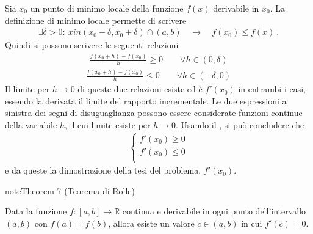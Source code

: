 \documentclass[letterpaper,10pt,italian]{jupyterBook}
\begin{document}
\sphinxAtStartPar
Sia \(x_0\) un punto di minimo locale della funzione \(f(x)\) derivabile in \(x_0\). La definizione di minimo locale permette di scrivere
\begin{equation*}
\begin{split}\exists \delta > 0: \ x in (x_0 - \delta, x_0 + \delta) \cap (a,b) \quad \rightarrow \quad f(x_0) \le f(x) \ .\end{split}
\end{equation*}
\sphinxAtStartPar
Quindi si possono scrivere le seguenti relazioni
\begin{equation*}
\begin{split}\frac{f(x_0 + h) - f(x_0)}{h} \ge 0 \qquad \forall h \in (0, \delta)\end{split}
\end{equation*}\begin{equation*}
\begin{split}\frac{f(x_0 + h) - f(x_0)}{h} \le 0 \qquad \forall h \in (-\delta,0)\end{split}
\end{equation*}
\sphinxAtStartPar
Il limite per \(h \rightarrow 0\) di queste due relazioni esiste ed è \(f'(x_0)\) in entrambi i casi, essendo la derivata il limite del rapporto incrementale. Le due espressioni a sinistra dei segni di disuguaglianza possono essere considerate funzioni continue della variabile \(h\), il cui limite esiste per \(h \rightarrow 0\). Usando il {\hyperref[\detokenize{ch/infinitesimal_calculus/analysis:infinitesimal-calculus-continuous-fun-thms-sign}]{}}, si può concludere che
\begin{equation*}
\begin{split}\begin{cases}
  f'(x_0) \ge 0 \\
  f'(x_0) \le 0 \\
\end{cases}\end{split}
\end{equation*}
\sphinxAtStartPar
e da queste la dimostrazione della tesi del problema, \(f'(x_0)\).


\label{ch/infinitesimal_calculus/derivatives:thm:infinitesimal-calculus:derivatives:thm:rolle}
\begin{sphinxadmonition}{note}{Theorem 7 (Teorema di Rolle)}



\sphinxAtStartPar
Data la funzione \(f: [a,b] \rightarrow \mathbb{R}\) continua e derivabile in ogni punto dell’intervallo \((a,b)\) con \(f(a) = f(b)\), allora esiste un valore \(c \in (a,b)\) in cui \(f'(c) = 0\).
\end{sphinxadmonition}
\end{document}
